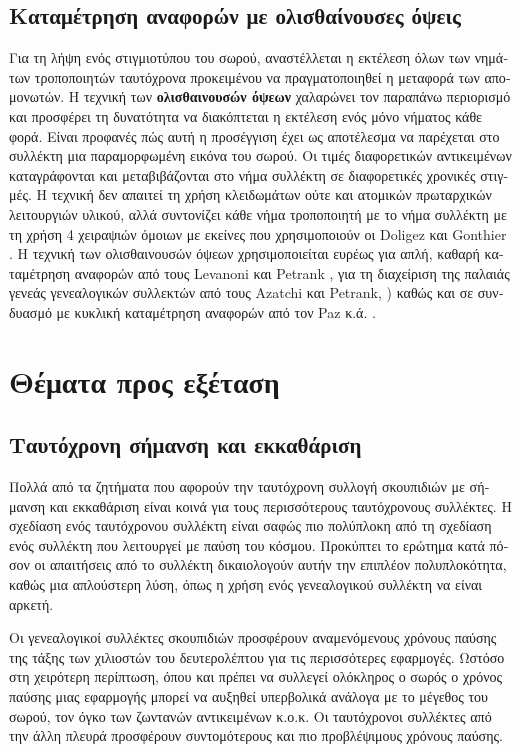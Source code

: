 \begin{greek}
\subsection{Καταμέτρηση αναφορών με ολισθαίνουσες όψεις}
Για τη λήψη ενός στιγμιοτύπου του σωρού, αναστέλλεται η
εκτέλεση όλων των νημάτων τροποποιητών ταυτόχρονα προκειμένου
να πραγματοποιηθεί η μεταφορά των απομονωτών. Η τεχνική των
\textbf{ολισθαινουσών όψεων} χαλαρώνει τον παραπάνω περιορισμό
και προσφέρει τη δυνατότητα να διακόπτεται η εκτέλεση ενός
μόνο νήματος κάθε φορά. Είναι προφανές πώς αυτή η προσέγγιση
έχει ως αποτέλεσμα να παρέχεται στο συλλέκτη μια παραμορφωμένη
εικόνα του σωρού. Οι τιμές διαφορετικών αντικειμένων
καταγράφονται και μεταβιβάζονται στο νήμα συλλέκτη σε
διαφορετικές χρονικές στιγμές. Η τεχνική δεν απαιτεί τη χρήση
κλειδωμάτων ούτε και ατομικών πρωταρχικών λειτουργιών υλικού,
αλλά συντονίζει κάθε νήμα τροποποιητή με το νήμα συλλέκτη με
τη χρήση 4 χειραψιών όμοιων με εκείνες που χρησιμοποιούν οι
Doligez και Gonthier \cite{DBLP:conf/popl/DoligezG94}. Η
τεχνική των ολισθαινουσών όψεων χρησιμοποιείται ευρέως για
απλή, καθαρή καταμέτρηση αναφορών από τους Levanoni και
Petrank \cite{levanoni1999scalable, DBLP:conf/oopsla/LevanoniP01,
DBLP:journals/toplas/LevanoniP06}, για τη διαχείριση της
παλαιάς γενεάς γενεαλογικών συλλεκτών από τους Azatchi και
Petrank, \cite{DBLP:conf/oopsla/AzatchiLPP03}) καθώς και
σε συνδυασμό με κυκλική καταμέτρηση αναφορών από τον Paz
κ.ά. \cite{DBLP:conf/cc/PazPBKR05, DBLP:conf/cc/PazP07}.

\section{Θέματα προς εξέταση}
\subsection{Ταυτόχρονη σήμανση και εκκαθάριση}
Πολλά από τα ζητήματα που αφορούν την ταυτόχρονη συλλογή
σκουπιδιών με σήμανση και εκκαθάριση είναι κοινά για τους
περισσότερους ταυτόχρονους συλλέκτες. Η σχεδίαση ενός
ταυτόχρονου συλλέκτη είναι σαφώς πιο πολύπλοκη από τη
σχεδίαση ενός συλλέκτη που λειτουργεί με παύση του κόσμου.
Προκύπτει το ερώτημα κατά πόσον οι απαιτήσεις από το συλλέκτη
δικαιολογούν αυτήν την επιπλέον πολυπλοκότητα, καθώς μια
απλούστερη λύση, όπως η χρήση ενός γενεαλογικού συλλέκτη
να είναι αρκετή.

Οι γενεαλογικοί συλλέκτες σκουπιδιών προσφέρουν αναμενόμενους
χρόνους παύσης της τάξης των χιλιοστών του δευτερολέπτου για
τις περισσότερες εφαρμογές. Ωστόσο στη χειρότερη περίπτωση,
όπου και πρέπει να συλλεγεί ολόκληρος ο σωρός ο χρόνος παύσης
μιας εφαρμογής μπορεί να αυξηθεί υπερβολικά ανάλογα με το
μέγεθος του σωρού, τον όγκο των ζωντανών αντικειμένων κ.ο.κ.
Οι ταυτόχρονοι συλλέκτες από την άλλη πλευρά προσφέρουν
συντομότερους και πιο προβλέψιμους χρόνους παύσης.


\end{greek}
